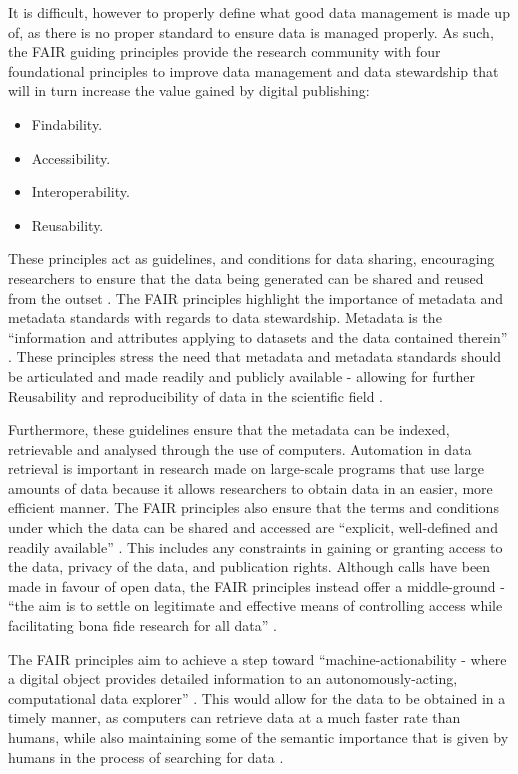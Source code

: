 \documentclass{cisfyp}
\begin{document}
It is difficult, however to properly define what good data management is made up of, as there is no proper standard to ensure data is managed properly. As such, the FAIR guiding principles provide the research community with four foundational principles to improve data management and data stewardship that will in turn increase the value gained by digital publishing: \cite{Wilkinson2016}
\begin{itemize}
	\item Findability.
	\item Accessibility.
	\item Interoperability.
	\item Reusability.
\end{itemize}

These principles act as guidelines, and conditions for data sharing, encouraging researchers to ensure that the data being generated can be shared and reused from the outset \cite{Boeckhout2018}. The FAIR principles highlight the importance of metadata and metadata standards with regards to data stewardship. Metadata  is the ``information and attributes applying to datasets and the data contained therein'' \cite{Boeckhout2018}. These principles stress the need that metadata and metadata standards should be articulated and made readily and publicly available - allowing for further Reusability and reproducibility of data in the scientific field \cite{Boeckhout2018}.

Furthermore, these guidelines ensure that the metadata can be indexed, retrievable and analysed through the use of computers. Automation in data retrieval is important in research made on large-scale programs that use large amounts of data because it allows researchers to obtain data in an easier, more efficient manner. The FAIR principles also ensure that the terms and conditions under which the data can be shared and accessed are ``explicit, well-defined and readily available'' \cite{Boeckhout2018}. This includes any constraints in gaining or granting access to the data, privacy of the data, and publication rights. Although calls have been made in favour of open data, the FAIR principles instead offer  a middle-ground - ``the aim is to settle on legitimate and effective means of controlling access while facilitating bona fide research for all data''  \cite{Boeckhout2018}.

The FAIR principles aim to achieve a step toward ``machine-actionability - where a digital object provides detailed information to an autonomously-acting, computational data explorer'' \cite{Wilkinson2016}. This would allow for the data to be obtained in a timely manner, as computers can retrieve data at a much faster rate than humans, while also maintaining some of the semantic importance that is given by humans in the process of searching for data \cite{Wilkinson2016}.
\end{document}

